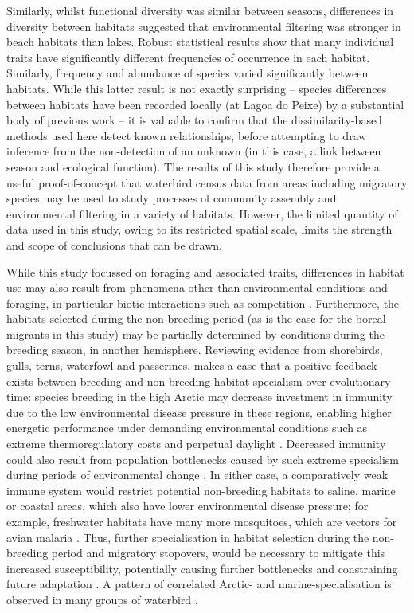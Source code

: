\documentclass[12pt,a4paper]{book}
\begin{document}
Similarly, whilst functional diversity was similar between seasons, differences in diversity between habitats suggested that environmental filtering was stronger in beach habitats than lakes. Robust statistical results show that many individual traits have significantly different frequencies of occurrence in each habitat. Similarly, frequency and abundance of species varied significantly between habitats. While this latter result is not exactly surprising -- species differences between habitats have been recorded locally (at Lagoa do Peixe) by a substantial body of previous work \citep[e.g][]{LaraResende1988, Nascimento1995, Fedrizzi2008, Goncalves2009} -- it is valuable to confirm that the dissimilarity-based methods used here detect known relationships, before attempting to draw inference from the non-detection of an unknown (in this case, a link between season and ecological function). The results of this study therefore provide a useful proof-of-concept that waterbird census data from areas including migratory species may be used to study processes of community assembly and environmental filtering in a variety of habitats. However, the limited quantity of data used in this study, owing to its restricted spatial scale, limits the strength and scope of conclusions that can be drawn.

While this study focussed on foraging and associated traits, differences in habitat use may also result from phenomena other than environmental conditions and foraging, in particular biotic interactions such as competition \citep{Jones2001a}. Furthermore, the habitats selected during the non-breeding period (as is the case for the boreal migrants in this study) may be partially determined by conditions during the breeding season, in another hemisphere. Reviewing evidence from shorebirds, gulls, terns, waterfowl and passerines, \citet{Piersma2007} makes a case that a positive feedback exists between breeding and non-breeding habitat specialism over evolutionary time: species breeding in the high Arctic may decrease investment in immunity due to the low environmental disease pressure in these regions, enabling higher energetic performance under demanding environmental conditions such as extreme thermoregulatory costs \citep{Piersma2011} and perpetual daylight \citep{Lesku2012}. Decreased immunity could also result from population bottlenecks caused by such extreme specialism during periods of environmental change \citep{Piersma2007}. In either case, a comparatively weak immune system would restrict potential non-breeding habitats to saline, marine or coastal areas, which also have lower environmental disease pressure; for example, freshwater habitats have many more mosquitoes, which are vectors for avian malaria \citep{Piersma2003}. Thus, further specialisation in habitat selection during the non-breeding period and migratory stopovers, would be necessary to mitigate this increased susceptibility, potentially causing further bottlenecks and constraining future adaptation \citep{Piersma2007}. A pattern of correlated Arctic- and marine-specialisation is observed in many groups of waterbird \citep{Piersma2007}.
\end{document}
